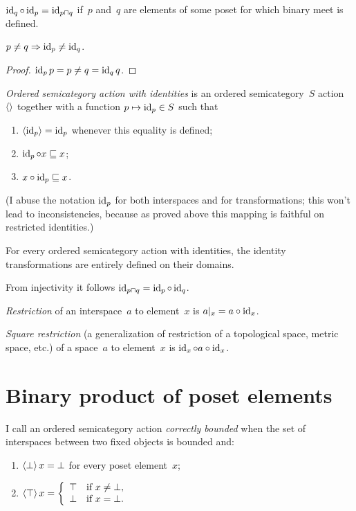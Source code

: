 \begin{obvious}
$\operatorname{id}_q\circ\operatorname{id}_p = \operatorname{id}_{p\sqcap q}$ if~$p$ and~$q$ are elements of some poset for which binary meet is defined.
\end{obvious}

\begin{prop}
$p\ne q\Rightarrow\operatorname{id}_p\ne\operatorname{id}_q$.
\end{prop}

\begin{proof}
$\operatorname{id}_p p=p \ne q = \operatorname{id}_q q$.
\end{proof}

\emph{Ordered semicategory action with identities} is an ordered semicategory~$S$ action~$\left\langle \right\rangle$ together with a function $p\mapsto\operatorname{id}_p\in S$ such that
\begin{enumerate}
\item $\left\langle \operatorname{id}_p\right\rangle=\operatorname{id}_p$ whenever this equality is defined;
\item $\operatorname{id}_p\circ x\sqsubseteq x$;
\item $x\circ\operatorname{id}_p\sqsubseteq x$.
\end{enumerate}
(I abuse the notation $\operatorname{id}_p$ for both interspaces and for transformations; this won't lead to inconsistencies, because as proved above this mapping is faithful on restricted identities.)

\begin{obvious}
For every ordered semicategory action with identities, the identity transformations are entirely defined on their domains.
\end{obvious}

From injectivity it follows $\operatorname{id}_{p\sqcap q} = \operatorname{id}_p\circ\operatorname{id}_q$.

\emph{Restriction} of an interspace~$a$ to element~$x$ is $a|_x=a\circ\operatorname{id}_x$.

\emph{Square restriction} (a generalization of restriction of a topological space, metric space, etc.) of a space~$a$ to element~$x$ is $\operatorname{id}_x\circ a\circ\operatorname{id}_x$.

\chapter{Binary product of poset elements}

\begin{defn}
I call an ordered semicategory action \emph{correctly bounded} when the set of interspaces between two fixed objects is bounded and:
\begin{enumerate}
\item $\left\langle \bot\right\rangle x = \bot$ for every poset element~$x$;
\item $\left\langle \top\right\rangle x =
\left\{\begin{array}{ll}\top&\text{if }x\ne\bot,\\\bot&\text{if }x=\bot.\end{array}\right.$
\end{enumerate}
\end{defn}


